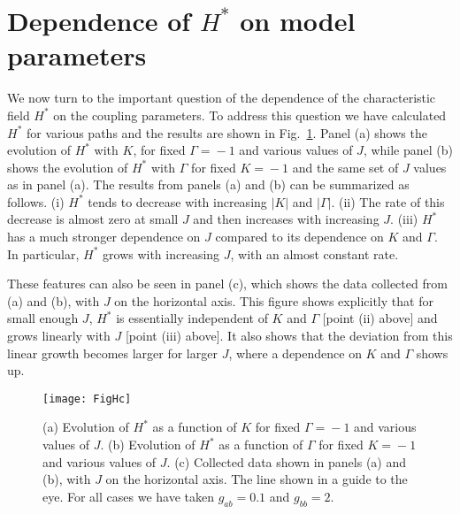 \documentclass[prx,aps,groupedaddress,twocolumn]{revtex4-1}
\def\cdbl{\color{darkblue}}
\begin{document}
\vspace*{-0.3cm}
\section{Dependence of $H^\ast$ on model parameters}
\vspace*{-0.3cm}
We now turn to the important question of the dependence of the characteristic field $H^\ast$ on the coupling parameters. To address this question we have calculated $H^\ast$ for various paths and the results are shown in Fig.~\ref{fig:HcFixed}. Panel (a) shows the evolution of $H^\ast$ with $K$, for fixed $\Gamma\!=\!-1$ and various values of $J$, while panel (b) shows the evolution of $H^\ast$ with $\Gamma$ for fixed $K\!=\!-1$ and the same set of $J$ values as in panel (a). 
%
The results from panels (a) and (b) can be summarized as follows. 
%
(i) $H^\ast$ tends to decrease with increasing $|K|$ and $|\Gamma|$. 
%
(ii) The rate of this decrease is almost zero at small $J$ and then increases with increasing $J$.  
%
(iii) $H^\ast$ has a much stronger dependence on $J$ compared to its dependence on $K$ and $\Gamma$. In particular, $H^\ast$ grows with increasing $J$, with an almost constant rate. 

These features can also be seen in panel (c), which shows the data collected from (a) and (b), with $J$ on the horizontal axis. 
%
This figure shows explicitly that for small enough $J$, $H^\ast$ is essentially independent of $K$ and $\Gamma$ [point (ii) above] and grows linearly with $J$ [point (iii) above]. 
%
It also shows that the deviation from this linear growth becomes larger for larger $J$, where a dependence on $K$ and $\Gamma$ shows up.



\begin{figure}[!t]
\texttt{[image: FigHc]}
\caption{
(a) Evolution of $H^\ast$ as a function of $K$ for fixed $\Gamma\!=\!-1$ and various values of $J$. 
%
(b) Evolution of $H^\ast$ as a function of $\Gamma$ for fixed $K\!=\!-1$ and various values of $J$. 
%
(c) Collected data shown in panels (a) and (b), with $J$ on the horizontal axis.  The line shown in a guide to the eye. 
%
For all cases we have taken $g_{ab}\!=\!0.1$ and $g_{bb}\!=\!2$.}
\vspace*{-0.25cm}
\label{fig:HcFixed}
\end{figure}
 
\end{document}
